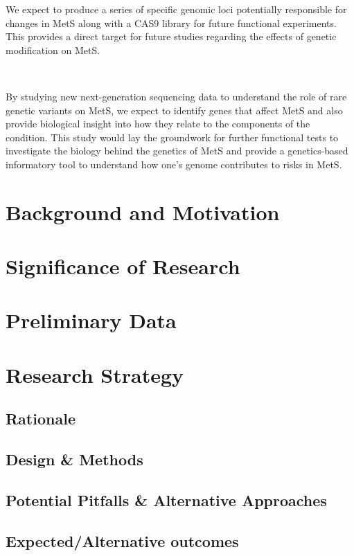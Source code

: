 \documentclass[11pt]{article}
\begin{document}
We expect to produce a series of specific genomic loci potentially responsible for changes in MetS along with a CAS9 library for future functional experiments. This provides a direct target for future studies regarding the effects of genetic modification on MetS.

\

By studying new next-generation sequencing data to understand the role of rare genetic variants on MetS, we expect to identify genes that affect MetS and also provide biological insight into how they relate to the components of the condition. This study would lay the groundwork for further functional tests to investigate the biology behind the genetics of MetS and provide a genetics-based informatory tool to understand how one's genome contributes to risks in MetS.

\newpage

\section*{Background and Motivation}



\section*{Significance of Research}

\section*{Preliminary Data}

\section*{Research Strategy}

\subsection*{Rationale}

\subsection*{Design \& Methods}

\subsection*{Potential Pitfalls \& Alternative Approaches}

\subsection*{Expected/Alternative outcomes}

 

\end{document}
